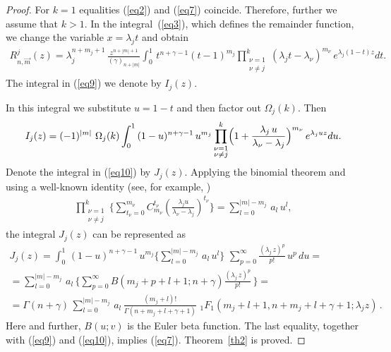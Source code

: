 \documentclass[
11pt,%
tightenlines,%
twoside,%
onecolumn,%
nofloats,%
nobibnotes,%
nofootinbib,%
superscriptaddress,%
noshowpacs,%
centertags]%
{revtex4}
\begin{document}
\begin{proof} For $k=1$ equalities (\ref{eq2}) and (\ref{eq7}) coincide.
Therefore, further we assume that $k>1$. In the integral~(\ref{eq3}),
which defines the remainder function, we change the variable $x=\lambda_j t$ and obtain
\begin{eqnarray}\label{eq9}
R_{n,\overrightarrow{m}}^j(z)=\lambda_j^{n+m_j+1}\,\frac{z^{n+|m|+1}}{(\gamma)_{n+|m|}}
\int_0^{1}\,t^{n+\gamma-1}(t-1)^{m_{j}}\prod^{k}_{\substack{
        \nu=1 \\
        \nu\neq j
}} (\lambda_jt-\lambda_{\nu})^{m_{\nu}}\,
e^{\lambda_j(1-t)z}dt.
\end{eqnarray}
The integral in (\ref{eq9}) we denote by $I_j(z)$.

In this integral we substitute $u=1-t$ and then factor out $\Omega_j(k)$. Then
\begin{eqnarray}\label{eq10}
I_j(z)=(-1)^{|m|}\,\,\Omega_j(k)\int_0^{1}\,(1-u)^{n+\gamma-1}\,u^{m_{j}}
\prod^{k}_{\substack{
        \nu=1 \\
        \nu\neq j
}}
\Bigl(1+\frac{\lambda_j\,u}{\lambda_{\nu}-\lambda_j}\Bigl)^{m_{\nu}}\,
e^{\lambda_juz}du.
\end{eqnarray}
Denote the integral in (\ref{eq10}) by $J_j(z)$. Applying
the binomial theorem and using  a well-known identity
(see, for example, \cite{Aptek})
\begin{eqnarray}\label{eq11}
 \prod^{k}_{\substack{
        \nu=1 \\
        \nu\neq j
}}\biggl\{\sum_{t_\nu=0}^{m_\nu}C^{t_{\nu}}_{m_{\nu}}
\left(\frac{\lambda_j u}
{\lambda_{\nu}-\lambda_j}\right)^{t_{\nu}} \biggl\}=
\sum_{l=0}^{|m|-m_j}\,a_l\,u^l,
\end{eqnarray}
the integral $J_j(z)$ can be represented as
\begin{gather*}
J_j(z)=\int_0^{1}\,(1-u)^{n+\gamma-1}\,u^{m_{j}}\biggl
\{\sum_{l=0}^{|m|-m_j}\,a_l\,u^l\biggl\}\,\,
\sum_{p=0}^{\infty}\frac{(\lambda_j\,z)^p}{p!}\,u^p\,du=\\
=\sum_{l=0}^{|m|-m_j}\,a_l\,\biggl\{\sum_{p=0}^{\infty}B(m_j+p+l+1;n+\gamma)
\frac{(\lambda_j\,z)^p}{p!}\,\biggl\}=\\
=\Gamma(n+\gamma)\,\sum_{l=0}^{|m|-m_j}\,a_l\,\frac{(m_j+l)!}{\Gamma(n+m_j+l+\gamma+1)}\,
\,_1F_1(m_j+l+1,n+m_j+l+\gamma+1;\lambda_jz)\,.
\end{gather*}
Here and further, $B(u;v)$ is the Euler beta function.
The last equality, together with (\ref{eq9}) and (\ref{eq10}), implies
(\ref{eq7}). Theorem~\ref{th2} is proved.
\end{proof}
\end{document}
